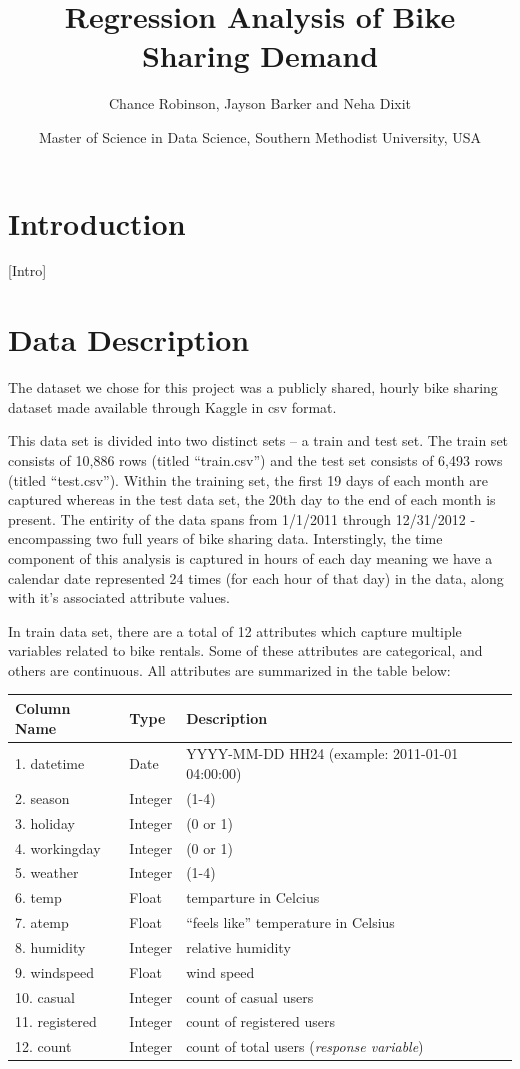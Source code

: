 \documentclass[american,]{article}
\title{Regression Analysis of Bike Sharing Demand}
\author{Chance Robinson, Jayson Barker and Neha Dixit}
\date{Master of Science in Data Science, Southern Methodist University, USA}
\begin{document}
\maketitle

\hypertarget{introduction}{%
\section{Introduction}\label{introduction}}

{[}Intro{]}

\hypertarget{data-description}{%
\section{Data Description}\label{data-description}}

The dataset we chose for this project was a publicly shared, hourly bike sharing dataset made available through Kaggle in csv format.

This data set is divided into two distinct sets -- a train and test set. The train set consists of 10,886 rows (titled ``train.csv'') and the test set consists of 6,493 rows (titled ``test.csv''). Within the training set, the first 19 days of each month are captured whereas in the test data set, the 20th day to the end of each month is present. The entirity of the data spans from 1/1/2011 through 12/31/2012 - encompassing two full years of bike sharing data. Interstingly, the time component of this analysis is captured in hours of each day meaning we have a calendar date represented 24 times (for each hour of that day) in the data, along with it's associated attribute values.

In train data set, there are a total of 12 attributes which capture multiple variables related to bike rentals. Some of these attributes are categorical, and others are continuous. All attributes are summarized in the table below:

\begin{longtable}[]{@{}lll@{}}
\toprule
Column Name & Type & Description\tabularnewline
\midrule
\endhead
1. datetime & Date & YYYY-MM-DD HH24 (example: 2011-01-01 04:00:00)\tabularnewline
2. season & Integer & (1-4)\tabularnewline
3. holiday & Integer & (0 or 1)\tabularnewline
4. workingday & Integer & (0 or 1)\tabularnewline
5. weather & Integer & (1-4)\tabularnewline
6. temp & Float & temparture in Celcius\tabularnewline
7. atemp & Float & ``feels like'' temperature in Celsius\tabularnewline
8. humidity & Integer & relative humidity\tabularnewline
9. windspeed & Float & wind speed\tabularnewline
10. casual & Integer & count of casual users\tabularnewline
11. registered & Integer & count of registered users\tabularnewline
12. count & Integer & count of total users (\emph{response variable})\tabularnewline
\bottomrule
\end{longtable}
\end{document}
